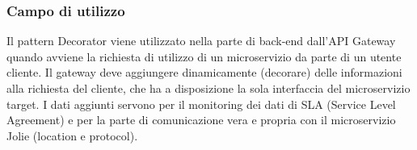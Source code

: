 \subsubsection{Campo di utilizzo}
Il pattern Decorator viene utilizzato nella parte di back-end dall'API Gateway quando avviene la richiesta di utilizzo di un microservizio da parte di un utente cliente. Il gateway deve aggiungere dinamicamente (decorare) delle informazioni alla richiesta del cliente, che ha a disposizione la sola interfaccia del microservizio target. I dati aggiunti servono per il monitoring dei dati di SLA (Service Level Agreement) e per la parte di comunicazione vera e propria con il microservizio Jolie (location e protocol).